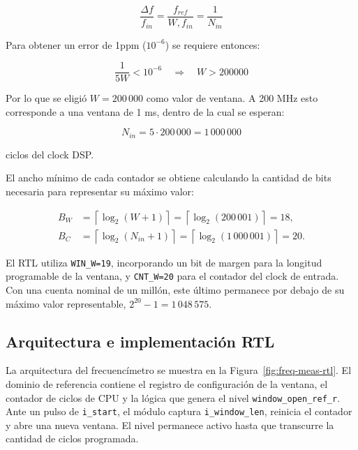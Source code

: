 \documentclass[10pt,a4paper]{article}
\begin{document}
\begin{equation}
\frac{\Delta f}{f_{in}}
=\frac{f_{ref}}{W,f_{in}}
=\frac{1}{N_{in}}
\label{eq:relative_res}
\end{equation}

Para obtener un error de 1ppm ($10^{-6}$) se requiere entonces:

\begin{equation}
    \frac{1}{5W}< 10^{-6}
    \quad\Longrightarrow\quad
    W>200000
    \label{eq:freq-min-window}
\end{equation}

Por lo que se eligió $W=200\,000$ como valor de ventana. A 200 MHz esto corresponde 
a una ventana de 1 ms, dentro de la cual se esperan:

\begin{equation}
    N_{in}=5\cdot 200\,000=1\,000\,000
    \label{eq:freq-count-nominal}
\end{equation}

ciclos del clock DSP.

El ancho mínimo de cada contador se obtiene calculando la cantidad de bits necesaria
para representar su máximo valor:

\begin{align}
    B_W & = \left\lceil\log_2(W+1)\right\rceil
          = \left\lceil\log_2(200\,001)\right\rceil = 18,
          \label{eq:freq-window-width}\\
    B_C & = \left\lceil\log_2(N_{in}+1)\right\rceil
          = \left\lceil\log_2(1\,000\,001)\right\rceil = 20.
          \label{eq:freq-count-width}
\end{align}

El RTL utiliza \texttt{WIN\_W=19}, incorporando un bit de margen para la longitud
programable de la ventana, y \texttt{CNT\_W=20} para el contador del clock de entrada.
Con una cuenta nominal de un millón, este último permanece por debajo de su máximo
valor representable, $2^{20}-1=1\,048\,575$.

\subsection{Arquitectura e implementación RTL}

La arquitectura del frecuencímetro se muestra en la
Figura~\ref{fig:freq-meas-rtl}. El dominio de referencia contiene el registro de
configuración de la ventana, el contador de ciclos de CPU y la lógica que genera el
nivel \texttt{window\_open\_ref\_r}. Ante un pulso de \texttt{i\_start}, el módulo
captura \texttt{i\_window\_len}, reinicia el contador y abre una nueva ventana. El
nivel permanece activo hasta que transcurre la cantidad de ciclos programada.
\end{document}
